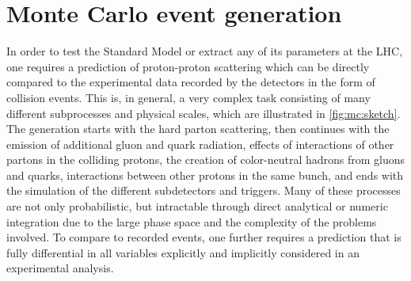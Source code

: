\chapter{Monte Carlo event generation}
\label{ch:mc}


In order to test the Standard Model or extract any of its parameters at the LHC, one requires a prediction of proton-proton scattering which can be directly compared to the experimental data recorded by the detectors in the form of collision events. This is, in general, a very complex task consisting of many different subprocesses and physical scales, which are illustrated in \cref{fig:mc:sketch}. The generation starts with the hard parton scattering, then continues with the emission of additional gluon and quark radiation, effects of interactions of other partons in the colliding protons, the creation of color-neutral hadrons from gluons and quarks, interactions between other protons in the same bunch, and ends with the simulation of the different subdetectors and triggers. Many of these processes are not only probabilistic, but intractable through direct analytical or numeric integration due to the large phase space and the complexity of the problems involved. To compare to recorded events, one further requires a prediction that is fully differential in all variables explicitly and implicitly considered in an experimental analysis.

